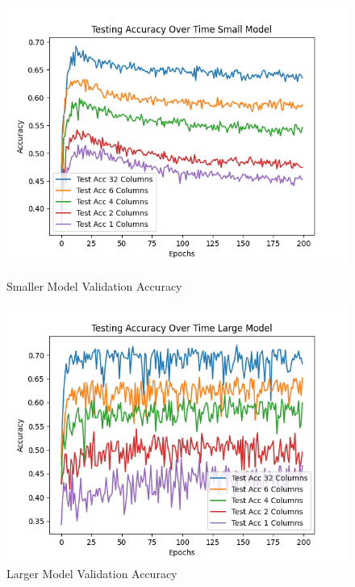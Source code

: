 \documentclass{article}
\begin{document}
\begin{figure}
		\includegraphics[width = \linewidth]{figures/test_acc_over_time_small.png}
		\caption{Smaller Model Validation Accuracy}
	\endminipage\hfill
		\includegraphics[width = \linewidth]{figures/test_acc_over_time_large_model.png}
		\caption{Larger Model Validation Accuracy}
	\endminipage\hfill	
\end{figure}
\end{document}
